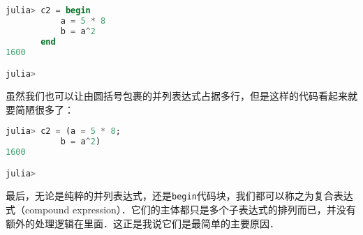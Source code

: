 \begin{lstlisting}[language=julia]
julia> c2 = begin
           a = 5 * 8
           b = a^2
       end
1600

julia> 
\end{lstlisting}

虽然我们也可以让由圆括号包裹的并列表达式占据多行，但是这样的代码看起来就要简陋很多了：

\begin{lstlisting}[language=julia]
julia> c2 = (a = 5 * 8;
           b = a^2)
1600

julia> 
\end{lstlisting}

最后，无论是纯粹的并列表达式，还是\verb|begin|代码块，我们都可以称之为复合表达式（compound expression）．它们的主体都只是多个子表达式的排列而已，并没有额外的处理逻辑在里面．这正是我说它们是最简单的主要原因．